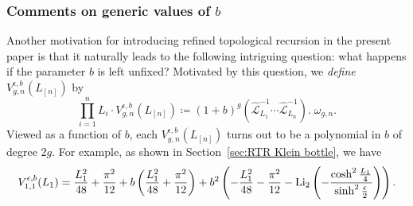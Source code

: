 \documentclass[12pt]{amsart}
\theoremstyle{plain}
\theoremstyle{definition}
\theoremstyle{remark}
\numberwithin{equation}{section}
\begin{document}









\subsubsection{Comments on generic values of $b$}

Another motivation for introducing refined topological recursion in the present paper is that it naturally leads to the following intriguing question: what happens if the parameter $b$ is left unfixed? Motivated by this question, we \emph{define} $V_{g,n}^{\epsilon,b}(L_{[n]})$ by
\begin{equation}
     \prod_{i=1}^nL_i\cdot V_{g,n}^{\epsilon,b}(L_{[n]})\coloneqq (1+b)^{g}(\hat{\mathcal{L}}_{L_1}^{-1}\cdots \hat{\mathcal{L}}_{L_n}^{-1}).\;\omega_{g,n}.
    \end{equation}
Viewed as a function of $b$, each $V_{g,n}^{\epsilon,b}(L_{[n]})$ turns out to be a polynomial in $b$ of degree $2g$. For example, as shown in Section~\ref{sec:RTR Klein bottle}, we have
\[V_{1,1}^{\epsilon,b}(L_1)=\frac{L_1^2}{48}+\frac{\pi^2}{12}+b\left(\frac{L_1^2}{48}+\frac{\pi^2}{12}\right)+b^2\left(-\frac{L_1^2}{48}-\frac{\pi^2}{12}-{\rm Li}_2\left(-\frac{\cosh^2\frac{L_1}{4}}{\sinh^2\frac{\epsilon}{2}}\right)\right).\]
\end{document}
